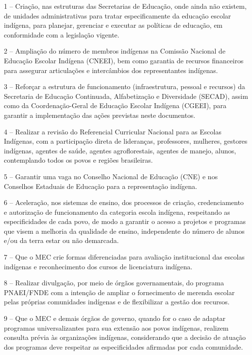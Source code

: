 \documentclass[
]{book}
\begin{document}
1 -- Criação, nas estruturas das Secretarias de Educação, onde ainda não existem, de unidades administrativas para tratar especificamente da educação escolar indígena, para planejar, gerenciar e executar as políticas de educação, em conformidade com a legislação vigente.

2 -- Ampliação do número de membros indígenas na Comissão Nacional de Educação Escolar Indígena (CNEEI), bem como garantia de recursos financeiros para assegurar articulações e intercâmbios dos representantes indígenas.

3 -- Reforçar a estrutura de funcionamento (infraestrutura, pessoal e recursos) da Secretaria de Educação Continuada, Alfabetização e Diversidade (SECAD), assim como da Coordenação-Geral de Educação Escolar Indígena (CGEEI), para garantir a implementação das ações previstas neste documentos.

4 -- Realizar a revisão do Referencial Curricular Nacional para as Escolas Indígenas, com a participação direta de lideranças, professores, mulheres, gestores indígenas, agentes de saúde, agentes agroflorestais, agentes de manejo, alunos, contemplando todos os povos e regiões brasileiras.

5 -- Garantir uma vaga no Conselho Nacional de Educação (CNE) e nos Conselhos Estaduais de Educação para a representação indígena.

6 -- Aceleração, nos sistemas de ensino, dos processos de criação, credenciamento e autorização de funcionamento da categoria escola indígena, respeitando as especificidades de cada povo, de modo a garantir o acesso a projetos e programas que visem a melhoria da qualidade de ensino, independente do número de alunos e/ou da terra estar ou não demarcada.

7 -- Que o MEC crie formas diferenciadas para avaliação institucional das escolas indígenas e reconhecimento dos cursos de licenciatura indígena.

8 -- Realizar divulgação, por meio de órgãos governamentais, do programa PNAEI/FNDE com a intenção de ampliar o fornecimento de merenda escolar pelas próprias comunidades indígenas e de flexibilizar a gestão dos recursos.

9 -- Que o MEC e demais órgãos de governo, quando for o caso de adaptar programas universalizantes para sua extensão aos povos indígenas, realizem consulta prévia às organizações indígenas, considerando que a decisão de atuação dos programas deve respeitar as especificidades afirmadas por cada comunidade.
\end{document}
